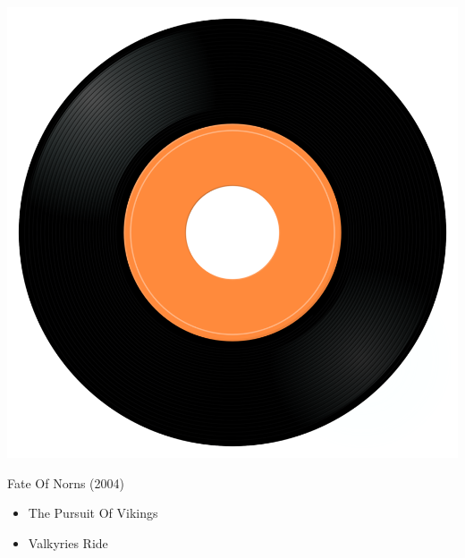 \begin{minipage}[t]{0.25\textwidth}\vspace{0pt}
\captionsetup{type=figure}
\includegraphics[width=\textwidth]{Images/cover.png}
\caption*{Fate Of Norns (2004)}
\end{minipage}
\begin{minipage}[t]{0.25\textwidth}\vspace{0pt}
\begin{itemize}[nosep,leftmargin=1em,labelwidth=*,align=left]
	\setlength{\itemsep}{0pt}
	\item The Pursuit Of Vikings
	\item Valkyries Ride
\end{itemize}
\end{minipage}
